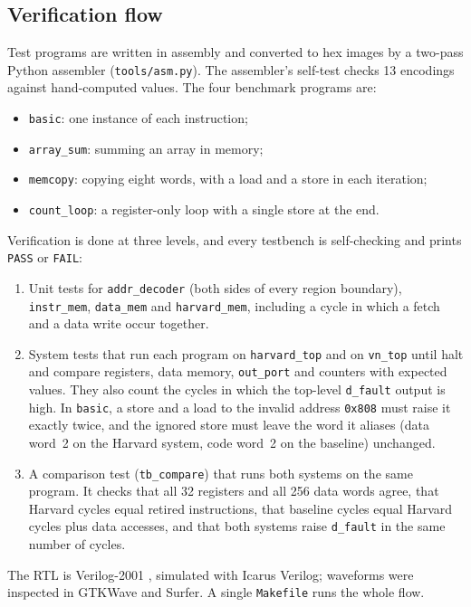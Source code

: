 \documentclass[conference]{IEEEtran}
\newcommand{\sig}[1]{\texttt{#1}}
\begin{document}
\subsection{Verification flow}
Test programs are written in assembly and converted to hex images by a two-pass Python assembler
(\sig{tools/asm.py}). The assembler's self-test checks 13 encodings against hand-computed values.
The four benchmark programs are:
\begin{itemize}
  \item \sig{basic}: one instance of each instruction;
  \item \sig{array\_sum}: summing an array in memory;
  \item \sig{memcopy}: copying eight words, with a load and a store in each iteration;
  \item \sig{count\_loop}: a register-only loop with a single store at the end.
\end{itemize}
Verification is done at three levels, and every testbench is self-checking and prints
\texttt{PASS} or \texttt{FAIL}:
\begin{enumerate}
  \item Unit tests for \sig{addr\_decoder} (both sides of every region boundary),
        \sig{instr\_mem}, \sig{data\_mem} and \sig{harvard\_mem}, including a cycle in which a
        fetch and a data write occur together.
  \item System tests that run each program on \sig{harvard\_top} and on \sig{vn\_top} until halt
        and compare registers, data memory, \sig{out\_port} and counters with expected values.
        They also count the cycles in which the top-level \sig{d\_fault} output is high. In
        \sig{basic}, a store and a load to the invalid address \texttt{0x808} must raise it
        exactly twice, and the ignored store must leave the word it aliases (data word~2 on the
        Harvard system, code word~2 on the baseline) unchanged.
  \item A comparison test (\sig{tb\_compare}) that runs both systems on the same program. It
        checks that all 32 registers and all 256 data words agree, that Harvard cycles equal
        retired instructions, that baseline cycles equal Harvard cycles plus data accesses, and that
        both systems raise \sig{d\_fault} in the same number of cycles.
\end{enumerate}
The RTL is Verilog-2001 \cite{ieee1364}, simulated with Icarus Verilog; waveforms were inspected
in GTKWave and Surfer. A single \sig{Makefile} runs the whole flow.
\end{document}
